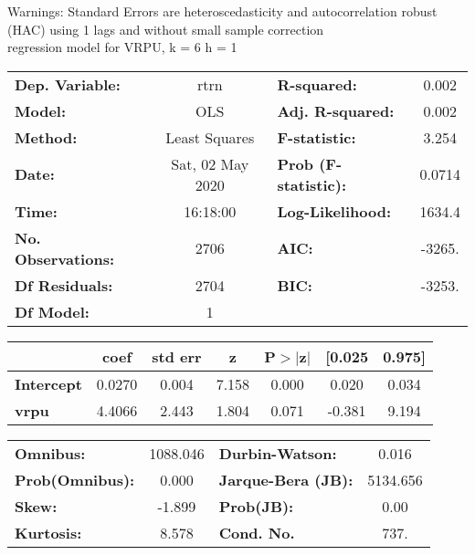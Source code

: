 Warnings: \newline
 [1] Standard Errors are heteroscedasticity and autocorrelation robust (HAC) using 1 lags and without small sample correction\\ 

regression model for VRPU, k = 6 h = 1\begin{center}
\begin{tabular}{lclc}
\toprule
\textbf{Dep. Variable:}    &       rtrn       & \textbf{  R-squared:         } &     0.002   \\
\textbf{Model:}            &       OLS        & \textbf{  Adj. R-squared:    } &     0.002   \\
\textbf{Method:}           &  Least Squares   & \textbf{  F-statistic:       } &     3.254   \\
\textbf{Date:}             & Sat, 02 May 2020 & \textbf{  Prob (F-statistic):} &   0.0714    \\
\textbf{Time:}             &     16:18:00     & \textbf{  Log-Likelihood:    } &    1634.4   \\
\textbf{No. Observations:} &        2706      & \textbf{  AIC:               } &    -3265.   \\
\textbf{Df Residuals:}     &        2704      & \textbf{  BIC:               } &    -3253.   \\
\textbf{Df Model:}         &           1      & \textbf{                     } &             \\
\bottomrule
\end{tabular}
\begin{tabular}{lcccccc}
                   & \textbf{coef} & \textbf{std err} & \textbf{z} & \textbf{P$> |$z$|$} & \textbf{[0.025} & \textbf{0.975]}  \\
\midrule
\textbf{Intercept} &       0.0270  &        0.004     &     7.158  &         0.000        &        0.020    &        0.034     \\
\textbf{vrpu}      &       4.4066  &        2.443     &     1.804  &         0.071        &       -0.381    &        9.194     \\
\bottomrule
\end{tabular}
\begin{tabular}{lclc}
\textbf{Omnibus:}       & 1088.046 & \textbf{  Durbin-Watson:     } &    0.016  \\
\textbf{Prob(Omnibus):} &   0.000  & \textbf{  Jarque-Bera (JB):  } & 5134.656  \\
\textbf{Skew:}          &  -1.899  & \textbf{  Prob(JB):          } &     0.00  \\
\textbf{Kurtosis:}      &   8.578  & \textbf{  Cond. No.          } &     737.  \\
\bottomrule
\end{tabular}
\end{center}

